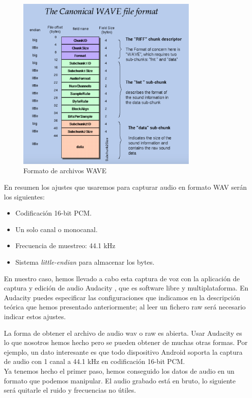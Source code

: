 \begin{figure}[th]
\centering
\includegraphics[width=9cm]{Figures/wave_format}
\decoRule
\caption[waveFormat]{Formato de archivos WAVE}
\label{fig:waveFormat}
\end{figure}

En resumen los ajustes que usaremos para capturar audio en formato WAV serán los siguientes:
\begin{itemize}
\item Codificación 16-bit PCM. 
\item Un solo canal o monocanal.
\item Frecuencia de muestreo: 44.1 kHz
\item Sistema \emph{little-endian} para almacenar los bytes.
\end{itemize}

En nuestro caso, hemos llevado a cabo esta captura de voz con la aplicación de captura y edición de audio Audacity \cite{REF} %
, que es software libre y multiplataforma. En Audacity puedes especificar las configuraciones que indicamos en la descripción teórica que hemos presentado anteriormente; al leer un fichero raw será necesario indicar estos ajustes.

La forma de obtener el archivo de audio wav o raw es abierta. Usar Audacity es lo que nosotros hemos hecho pero se pueden obtener de muchas otras formas. Por ejemplo, un dato interesante es que todo dispositivo Android soporta la captura de audio con 1 canal a 44.1 kHz en codificación 16-bit PCM.\\

Ya tenemos hecho el primer paso, hemos conseguido los datos de audio en un formato que podemos manipular. El audio grabado está en bruto, lo siguiente será quitarle el ruido y frecuencias no útiles.

